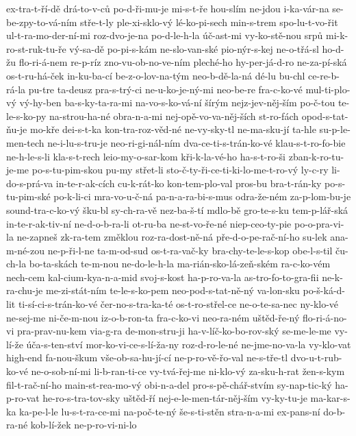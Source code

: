 ex-tra-t-ří-dě
drá-to-v-ců
po-d-ři-mu-je
mi-s-t-ře
hou-slím
ne-jdou
i-ka-vár-na
se-be-zpy-to-vá-ním
stře-t-ly
ple-xi-sklo-vý
lé-ko-pi-sech
min-s-trem
spo-lu-t-vo-řit
ul-t-ra-mo-der-ní-mi
roz-dvo-je-na
po-d-le-h-la
úč-ast-mi
vy-ko-stě-nou
srpů
mi-k-ro-st-ruk-tu-ře
vý-sa-dě
po-pi-s-kám
ne-slo-van-ské
pio-nýr-s-kej
ne-o-třá-sl
ho-d-žu
flo-ri-á-nem
re-p-ríz
zno-vu-ob-no-ve-ním
pleché-ho
hy-per-já-d-ro
ne-za-pí-ská
os-t-ru-há-ček
in-ku-ba-cí
be-z-o-lov-na-tým
neo-b-dě-la-ná
dé-lu
bu-chl
ce-re-b-rá-la
pu-tre
ta-deusz
pra-s-trý-ci
ne-u-ko-je-ný-mi
neo-be-re
fra-c-ko-vé
mul-ti-plo-vý
vý-hy-ben
ba-s-ky-ta-ra-mi
na-vo-s-ko-vá-ní
šírým
nejz-jev-něj-ším
po-č-tou
te-le-s-ko-py
na-strou-ha-né
obra-n-a-mi
nej-opě-vo-va-něj-ších
st-ro-fách
opod-s-tat-ňu-je
mo-kře
dei-s-t-ka
kon-tra-roz-věd-né
ne-vy-sky-tl
ne-ma-sku-jí
ta-hle
su-p-le-men-tech
ne-i-lu-s-tru-je
neo-ri-gi-nál-ním
dva-ce-ti-s-trán-ko-vé
klau-s-t-ro-fo-bie
ne-h-le-s-li
kla-s-t-rech
leio-my-o-sar-kom
kři-k-la-vé-ho
ha-s-t-ro-ši
zban-k-ro-tu-je-me
po-s-tu-pim-skou
pu-my
střet-li
sto-č-ty-ři-ce-ti-ki-lo-me-t-ro-vý
ly-c-ry
li-do-s-prá-va
in-te-r-ak-cích
cu-k-rát-ko
kon-tem-plo-val
pros-bu
bra-t-rán-ky
po-s-tu-pim-ské
po-k-li-ci
mra-vo-u-č-ná
pa-n-a-ra-bi-s-mus
odra-že-ném
za-p-lom-bu-je
sound-tra-c-ko-vý
šku-bl
sy-ch-ra-vě
nez-ba-š-tí
mdlo-bě
gro-te-s-ku
tem-p-lář-ská
in-te-r-ak-tiv-ní
ne-d-o-b-ra-li
ot-ru-ba
ne-st-vo-ře-né
niep-ceo-ty-pie
po-o-pra-vi-la
ne-zapneš
zk-ra-tem
změklou
roz-ra-dost-ně-ná
pře-d-o-pe-rač-ní-ho
su-lek
ana-m-né-zou
ne-p-ři-l-ne
ta-m-od-sud
os-t-ra-vač-ky
bra-chy-te-le-s-kop
obe-l-s-til
ču-ch-la
bo-ta-skách
te-m-nou
ne-do-le-h-la
ma-rián-sko-lá-zeň-ském
ra-c-ko-vém
nech-cem
kal-cium-kya-n-a-mid
svoj-s-kost
ha-p-ro-va-la
as-tro-fo-to-gra-fii
ne-k-ra-chu-je
me-zi-stát-ním
te-le-s-ko-pem
neo-pod-s-tat-ně-ný
va-lon-sku
po-š-ká-d-lit
ti-sí-ci-s-trán-ko-vé
čer-no-s-tra-ka-té
os-t-ro-střel-ce
ne-o-te-sa-nec
ny-klo-vé
ne-sej-me
ni-če-m-nou
iz-o-b-ron-ta
fra-c-ko-vi
neo-ra-ném
uštěd-ře-ný
flo-ri-á-no-vi
pra-prav-nu-kem
via-g-ra
de-mon-stru-ji
ha-v-líč-ko-bo-rov-ský
se-me-le-me
vy-lí-že
úča-s-ten-ství
mor-ko-vi-ce-s-lí-ža-ny
roz-d-ro-le-né
ne-jme-no-va-la
vy-klo-vat
high-end
fa-nou-škum
vše-ob-sa-hu-jí-cí
ne-p-ro-vě-řo-val
ne-s-tře-tl
dvo-u-t-rub-ko-vé
ne-o-sob-ní-mi
li-b-ran-ti-ce
vy-tvá-řej-me
ni-klo-vý
za-sku-h-rat
žen-s-kym
fil-t-rač-ní-ho
main-st-rea-mo-vý
obi-n-a-del
pro-s-pě-chář-stvím
sy-nap-tic-ký
ha-p-ro-vat
he-ro-s-tra-tov-sky
uštěd-ří
nej-e-le-men-tár-něj-ším
vy-ky-tu-je
ma-kar-s-ka
ka-pe-l-le
lu-s-t-ra-ce-mi
na-poč-te-ný
še-s-ti-stěn
stra-n-a-mi
ex-pans-ní
do-b-ra-né
kob-lí-žek
ne-p-ro-vi-ni-lo
